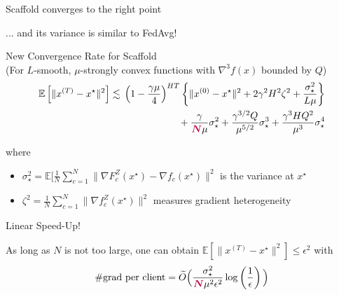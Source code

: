 \documentclass[aspectratio=169,12pt]{beamer}
\begin{document}
\begin{frame}[t]
\begin{center}
  \end{center}

  \begin{center}
    Scaffold converges to the right point


    ... and its variance is similar to FedAvg!
  \end{center}


\end{frame}


\begin{frame}{New Convergence Rate for Scaffold\\[-0.5em]
    \small (For $L$-smooth, $\mu$-strongly convex functions with $\nabla^3 f(x)$ bounded by $Q$)}
\begin{align*}
\mathbb{E}\left[ \| x^{(T)} - x^\star \|^2 \right] 
& \lesssim{} \left( 1 - \frac{\gamma \mu}{4} \right)^{HT}
\left\{ 
\| x^{(0)} - x^\star \|^2
+
2\gamma^2 H^2 \zeta^2
+
\frac{ \sigma_\star^2 }{L\mu}
\right\}
\\ &  \quad\quad\quad\quad\quad\quad\quad
+ 
\frac{\gamma }{\textcolor{purple}{\boldsymbol{N}} \mu} \sigma_\star^2 
+ \frac{ \gamma^{3/2} Q }{\mu^{5/2}} \sigma_\star^3
+ \frac{ \gamma^3 H Q^2}{\mu^3} \sigma_\star^4
\end{align*}


where
\begin{itemize}
\item \small
  $\sigma_\star^2 = \mathbb{E}[ \frac{1}{N} \sum_{c=1}^N \| \nabla F_c^Z(x^\star) - \nabla f_c(x^\star) \|^2$ is the variance at $x^\star$
\item \small
  $\zeta^2 = \frac{1}{N} \sum_{c=1}^N \| \nabla f_c^Z(x^\star) \|^2$ measures gradient heterogeneity
\end{itemize}



\end{frame}

\begin{frame}{Linear Speed-Up!}

  As long as $N$ is not too large, one can obtain $\mathbb{E}\left[ \| x^{(T)} - x^\star \|^2 \right] \le \epsilon^2 $ with
  \begin{align*}
    \# \text{grad per client}
    = \widetilde O\Big( \frac{\sigma_\star^2}{\textcolor{purple}{\boldsymbol{N}} \mu^2 \epsilon^2} 
    \log\left( 
    \frac{1}{\epsilon}
    \right) \Big)
  \end{align*}
  
\end{frame}
\end{document}
